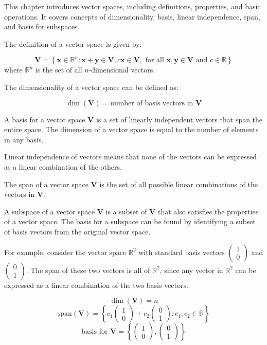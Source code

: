 \documentclass{report}%
\begin{document}
This chapter introduces vector spaces, including definitions, properties, and basic operations. It covers concepts of dimensionality, basis, linear independence, span, and basis for subspaces.

The definition of a vector space is given by:

\[
 \mathbf{V} = \left\{ \mathbf{x} \in \mathbb{R}^n : \mathbf{x} + \mathbf{y} \in \mathbf{V}, c\mathbf{x} \in \mathbf{V}, \text{ for all } \mathbf{x}, \mathbf{y} \in \mathbf{V} \text{ and } c \in \mathbb{R} \right\}
\]
where $\mathbb{R}^n$ is the set of all $n$-dimensional vectors.

The dimensionality of a vector space can be defined as:

\[
\dim(\mathbf{V}) = \text{number of basis vectors in }\mathbf{V}
\]

A basis for a vector space $\mathbf{V}$ is a set of linearly independent vectors that span the entire space. The dimension of a vector space is equal to the number of elements in any basis.

Linear independence of vectors means that none of the vectors can be expressed as a linear combination of the others.

The span of a vector space $\mathbf{V}$ is the set of all possible linear combinations of the vectors in $\mathbf{V}$.

A subspace of a vector space $\mathbf{V}$ is a subset of $\mathbf{V}$ that also satisfies the properties of a vector space. The basis for a subspace can be found by identifying a subset of basis vectors from the original vector space.

For example, consider the vector space $\mathbb{R}^2$ with standard basis vectors $\begin{pmatrix} 1 \\ 0 \end{pmatrix}$ and $\begin{pmatrix} 0 \\ 1 \end{pmatrix}$. The span of these two vectors is all of $\mathbb{R}^2$, since any vector in $\mathbb{R}^2$ can be expressed as a linear combination of the two basis vectors.

\[
\dim(\mathbf{V}) = n
\]
\[
\text{span}(\mathbf{V}) = \left\{ c_1\begin{pmatrix} 1 \\ 0 \end{pmatrix} + c_2\begin{pmatrix} 0 \\ 1 \end{pmatrix} : c_1, c_2 \in \mathbb{R} \right\}
\]
\[
\text{basis for }\mathbf{V} = \left\{ \begin{pmatrix} 1 \\ 0 \end{pmatrix}, \begin{pmatrix} 0 \\ 1 \end{pmatrix} \right\}
\]%
\end{document}
